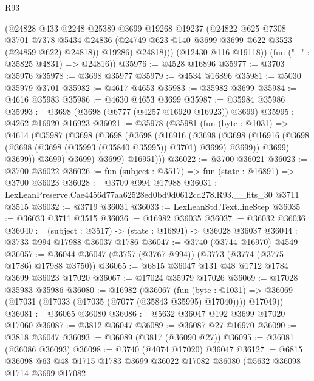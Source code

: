 \begin{lexlean}{R93}
\begin{coremodule}
              (@24828
                @433
                @2248
                @25389
                @3699
                @19268
                @19237
                (@24822
                  @625
                  @7308
                  @3701
                  @7378
                  @5434
                  @24836
                  (@24749 @623 @140 @3699 @3699 @622 @3523 (@24859 @622) @24818))
                @19286)
              @24818)))
        (@12430 @116 @19118))
      (fun ("_" : @35825 @4831) => @24816))
@35976 := @4528 @16896
@35977 := @3703 @35976
@35978 := @3698 @35977
@35979 := @4534 @16896
@35981 := @5030 @35979 @3701
@35982 := @4617 @4653
@35983 := @35982 @3699
@35984 := @4616 @35983
@35986 := @4630 @4653 @3699
@35987 := @35984 @35986
@35993 := @3698 (@3698 (@6777 (@4257 @16920 @16923)) @3699)
@35995 := @4262 @16920 @16923
@36021 := @35978
    (@35981
      (fun (byte : @1031) =>
      @4614
        (@35987
          (@3698
            (@3698
              (@3698
                (@16916
                  (@3698
                    (@3698
                      (@16916 (@3698 (@3698 (@3698 (@35993 (@35840 @35995)) @3701) @3699) @3699))
                      @3699)
                    @3699))
                @3699)
              @3699)
            @3699)
          @16951)))
@36022 := @3700 @36021
@36023 := @3700 @36022
@36026 := fun (subject : @3517) => fun (state : @16891) => @3700 @36023
@36028 := @3709 @994 @17988
@36031 := LexLeanPreserve.Cae4456d77aa62528ed0bd9d0612cd278.R93.__fits_30 @3711 @3515
@36032 := @3719 @36031
@36033 := LexLeanStd.Text.lineStep
@36035 := @36033 @3711 @3515
@36036 := @16982 @36035
@36037 := @36032 @36036
@36040 := (subject : @3517) -> (state : @16891) -> @36028 @36037
@36044 := @3733 @994 @17988 @36037 @1786
@36047 := @3740 (@3744 @16970) @4549
@36057 := @36044 @36047 (@3757 (@3767 @994)) (@3773 (@3774 (@3775 @1786) @17988 @3750))
@36065 := @6815 @36047 @131 @48 @1712 @1784 @3699 @36023 @17020
@36067 := @17024 @35979 @17026
@36069 := @17028 @35983 @35986
@36080 := @16982
    (@36067
      (fun (byte : @1031) =>
      @36069 (@17031 (@17033 (@17035 (@7077 (@35843 @35995) @17040)))) @17049))
@36081 := @36065 @36080
@36086 := @5632 @36047 @192 @3699 @17020 @17060
@36087 := @3812 @36047
@36089 := @36087 @27 @16970
@36090 := @3818 @36047
@36093 := @36089 (@3817 (@36090 @27))
@36095 := @36081 (@36086 @36093)
@36098 := @3740 (@4074 @17020) @36047
@36127 := @6815
    @36098
    @63
    @48
    @1715
    @1783
    @3699
    @36022
    @17082
    @36080
    (@5632
      @36098
      @1714
      @3699
      @17082

\end{coremodule}
\end{lexlean}
